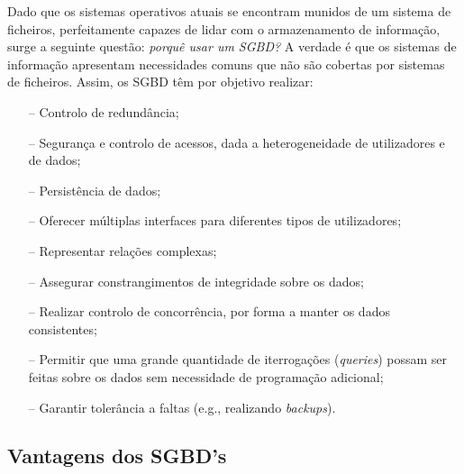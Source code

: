 \documentclass[oneside]{book}
\theoremstyle{definition}
\begin{document}
Dado que os sistemas operativos atuais se encontram munidos de um sistema de ficheiros, perfeitamente capazes de lidar com o armazenamento de informação, surge a seguinte questão: \textit{porquê usar um SGBD?} A verdade é que os sistemas de informação apresentam necessidades comuns que não são cobertas por sistemas de ficheiros. Assim, os SGBD têm por objetivo realizar:

\begin{itemize}
    \itemsep0cm
    \item[--] Controlo de redundância;
    \item[--] Segurança e controlo de acessos, dada a heterogeneidade de utilizadores e de dados;
    \item[--] Persistência de dados;
    \item[--] Oferecer múltiplas interfaces para diferentes tipos de utilizadores;
    \item[--] Representar relações complexas;
    \item[--] Assegurar constrangimentos de integridade sobre os dados;
    \item[--] Realizar controlo de concorrência, por forma a manter os dados consistentes;
    \item[--] Permitir que uma grande quantidade de iterrogações (\textit{queries}) possam ser feitas sobre os dados sem necessidade de programação adicional;   
    \item[--] Garantir tolerância a faltas (e.g., realizando \textit{backups}). 
\end{itemize}

\subsection{Vantagens dos SGBD's}
\vspace{0.25cm}
\end{document}
